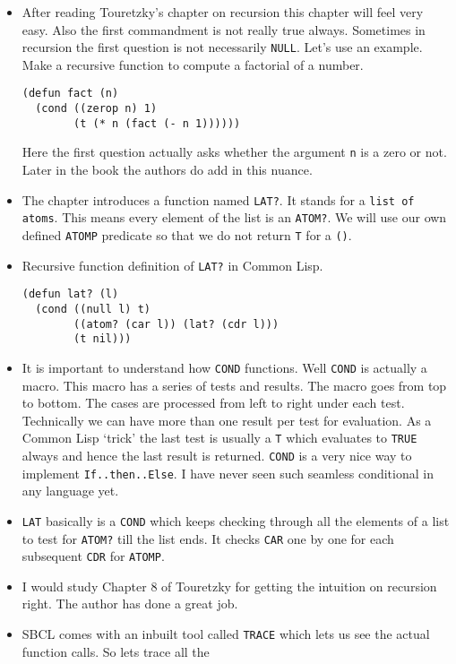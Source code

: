 \documentclass[11pt]{article}
\begin{document}
\vspace{1em}
\begin{itemize}
\item After reading Touretzky's chapter on recursion this chapter will feel very easy. Also the first commandment is not
really true always. Sometimes in recursion the first question is not necessarily \texttt{NULL}. Let's use an example. Make
a recursive  function to compute a factorial of a number.
\begin{verbatim}
(defun fact (n)
  (cond ((zerop n) 1)
        (t (* n (fact (- n 1))))))
\end{verbatim}
Here the first question actually asks whether the argument \texttt{n} is a zero or not. Later in the book the authors do
add in this nuance.
\item The chapter introduces a function named \texttt{LAT?}. It stands for a \texttt{list of atoms}. This means every element of the
list is an \texttt{ATOM?}. We will use our own defined \texttt{ATOMP} predicate so that we do not return \texttt{T} for a \texttt{()}.
\item Recursive function definition of \texttt{LAT?} in Common Lisp.
\begin{verbatim}
(defun lat? (l)
  (cond ((null l) t)
        ((atom? (car l)) (lat? (cdr l)))
        (t nil)))
\end{verbatim}
\item It is important to understand how \texttt{COND} functions. Well \texttt{COND} is actually a macro. This macro has a series of
tests and results. The macro goes from top to bottom. The cases are processed from left to right under each test.
Technically we can have more than one result per test for evaluation. As a Common Lisp `trick' the last test is
usually a \texttt{T} which evaluates to \texttt{TRUE} always and hence the last result is returned. \texttt{COND} is a very nice way to
implement \texttt{If..then..Else}. I have never seen such seamless conditional in any language yet.
\item \texttt{LAT} basically is a \texttt{COND} which keeps checking through all the elements of a list to test for \texttt{ATOM?} till the
list ends. It checks \texttt{CAR} one by one for each subsequent \texttt{CDR} for \texttt{ATOMP}.
\item I would study Chapter 8 of Touretzky for getting the intuition on recursion right. The author has done a great job.
\item SBCL comes with an inbuilt tool called \texttt{TRACE} which lets us see the actual function calls. So lets trace all the

\end{itemize}
\end{document}
